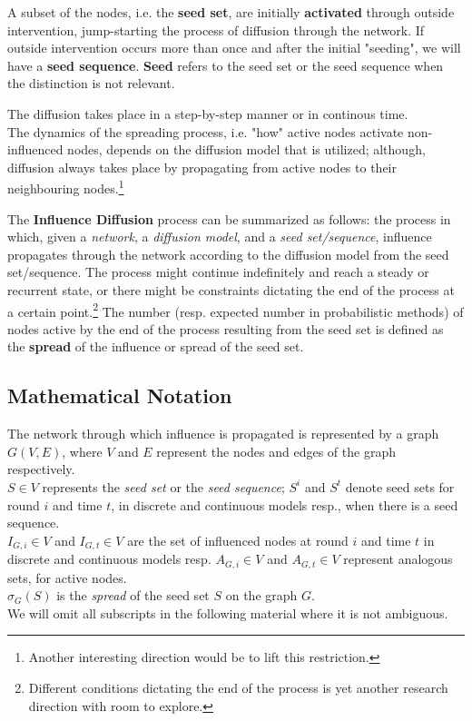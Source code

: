 \documentclass[twocolumn, 10pt]{article}
\begin{document}
A subset of the nodes, i.e. the \textbf{seed set}, are initially \textbf{activated} through outside intervention, jump-starting the process of diffusion through the network. If outside intervention occurs more than once and after the initial "seeding", we will have a \textbf{seed sequence}. \textbf{Seed} refers to the seed set or the seed sequence when the distinction is not relevant.

The diffusion takes place in a step-by-step manner or in continous time.\\
The dynamics of the spreading process, i.e. "how" active nodes activate non-influenced nodes, depends on the diffusion model that is utilized; although, diffusion always takes place by propagating from active nodes to their neighbouring nodes.\footnote{Another interesting direction would be to lift this restriction.}

The \textbf{Influence Diffusion} process can be summarized as follows: the process in which, given a \textit{network}, a \textit{diffusion model}, and a \textit{seed set/sequence}, influence propagates through the network according to the diffusion model from the seed set/sequence. The process might continue indefinitely and reach a steady or recurrent state, or there might be constraints dictating the end of the process at a certain point.\footnote{Different conditions dictating the end of the process is yet another research direction with room to explore.} The number (resp. expected number in probabilistic methods) of nodes active by the end of the process resulting from the seed set is defined as the \textbf{spread} of the influence or spread of the seed set.
\subsection{Mathematical Notation}
The network through which influence is propagated is represented by a graph $G(V, E)$, where $V$ and $E$ represent the nodes and edges of the graph respectively.\\
$S \in V$ represents the \textit{seed set} or the \textit{seed sequence}; $S^i$ and $S^t$ denote seed sets for round $i$ and time $t$, in discrete and continuous models resp., when there is a seed sequence. \\
$I_{G, i} \in V$ and $I_{G, t} \in V$ are the set of influenced nodes at round $i$ and time $t$ in discrete and continuous models resp.
$A_{G, i} \in V$ and $A_{G, t} \in V$ represent analogous sets, for active nodes. \\
$\sigma_G (S)$ is the \textit{spread} of the seed set $S$ on the graph $G$.  \\
We will omit all subscripts in the following material where it is not ambiguous. 
\end{document}
